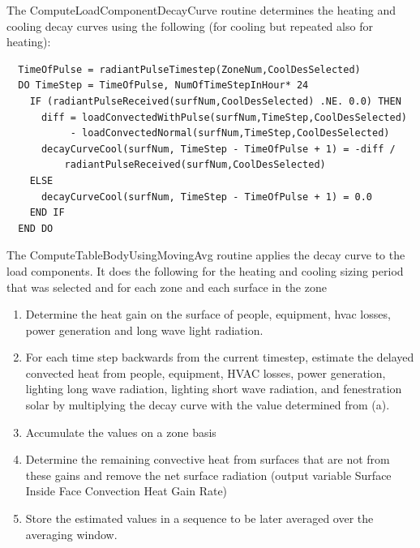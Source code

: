 The ComputeLoadComponentDecayCurve routine determines the heating and cooling decay curves using the following (for cooling but repeated also for heating):

\begin{lstlisting}
  TimeOfPulse = radiantPulseTimestep(ZoneNum,CoolDesSelected)
  DO TimeStep = TimeOfPulse, NumOfTimeStepInHour* 24
    IF (radiantPulseReceived(surfNum,CoolDesSelected) .NE. 0.0) THEN
      diff = loadConvectedWithPulse(surfNum,TimeStep,CoolDesSelected)
           - loadConvectedNormal(surfNum,TimeStep,CoolDesSelected)
      decayCurveCool(surfNum, TimeStep - TimeOfPulse + 1) = -diff /
          radiantPulseReceived(surfNum,CoolDesSelected)
    ELSE
      decayCurveCool(surfNum, TimeStep - TimeOfPulse + 1) = 0.0
    END IF
  END DO
\end{lstlisting}

The ComputeTableBodyUsingMovingAvg routine applies the decay curve to the load components. It does the following for the heating and cooling sizing period that was selected and for each zone and each surface in the zone

\begin{enumerate}
\def\labelenumi{\alph{enumi}.}
\item
  Determine the heat gain on the surface of people, equipment, hvac losses, power generation and long wave light radiation.
\item
  For each time step backwards from the current timestep, estimate the delayed convected heat from people, equipment, HVAC losses, power generation, lighting long wave radiation, lighting short wave radiation, and fenestration solar by multiplying the decay curve with the value determined from (a).
\item
  Accumulate the values on a zone basis
\item
  Determine the remaining convective heat from surfaces that are not from these gains and remove the net surface radiation (output variable Surface Inside Face Convection Heat Gain Rate)
\item
  Store the estimated values in a sequence to be later averaged over the averaging window.
\end{enumerate}
